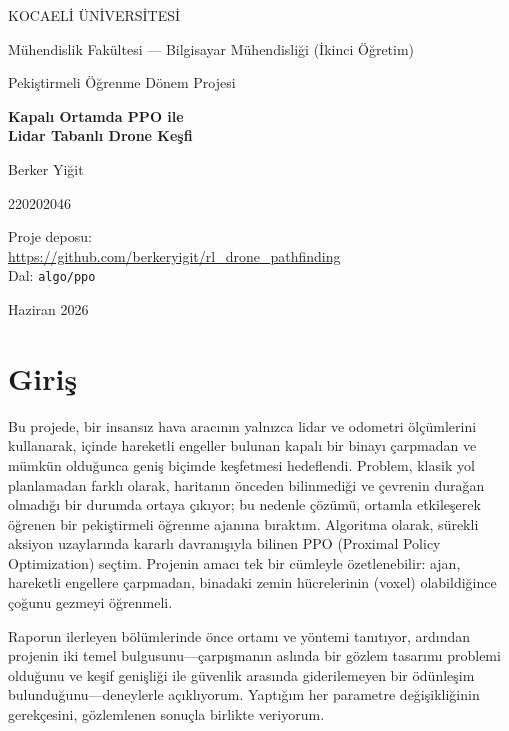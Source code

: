 \documentclass[11pt,a4paper]{article}
\begin{document}
\begin{titlepage}
\centering
\vspace*{2cm}
{\large KOCAELİ ÜNİVERSİTESİ\par}
{\large Mühendislik Fakültesi --- Bilgisayar Mühendisliği (İkinci Öğretim)\par}
\vspace{2.5cm}
{\large Pekiştirmeli Öğrenme Dönem Projesi\par}
\vspace{0.8cm}
{\Huge\bfseries Kapalı Ortamda PPO ile\\[0.3cm] Lidar Tabanlı Drone Keşfi\par}
\vspace{2.5cm}
{\large Berker Yiğit\par}
{\large 220202046\par}
\vspace{1.2cm}
{\small Proje deposu:\\ \url{https://github.com/berkeryigit/rl_drone_pathfinding}\\[0.2cm]
Dal: \texttt{algo/ppo}\par}
\vfill
{\large Haziran 2026\par}
\end{titlepage}

\section{Giriş}

Bu projede, bir insansız hava aracının yalnızca lidar ve odometri ölçümlerini kullanarak, içinde
hareketli engeller bulunan kapalı bir binayı çarpmadan ve mümkün olduğunca geniş biçimde keşfetmesi
hedeflendi. Problem, klasik yol planlamadan farklı olarak,
haritanın önceden bilinmediği ve çevrenin durağan olmadığı bir durumda ortaya çıkıyor; bu nedenle
çözümü, ortamla etkileşerek öğrenen bir pekiştirmeli öğrenme ajanına bıraktım. Algoritma olarak,
sürekli aksiyon uzaylarında kararlı davranışıyla bilinen PPO (Proximal Policy Optimization) seçtim.
Projenin amacı tek bir cümleyle özetlenebilir: ajan, hareketli engellere çarpmadan, binadaki
zemin hücrelerinin (voxel) olabildiğince çoğunu gezmeyi öğrenmeli.

Raporun ilerleyen bölümlerinde önce ortamı ve yöntemi tanıtıyor, ardından projenin iki temel
bulgusunu---çarpışmanın aslında bir gözlem tasarımı problemi olduğunu ve keşif genişliği ile
güvenlik arasında giderilemeyen bir ödünleşim bulunduğunu---deneylerle açıklıyorum. Yaptığım her
parametre değişikliğinin gerekçesini, gözlemlenen sonuçla birlikte veriyorum.
\end{document}
